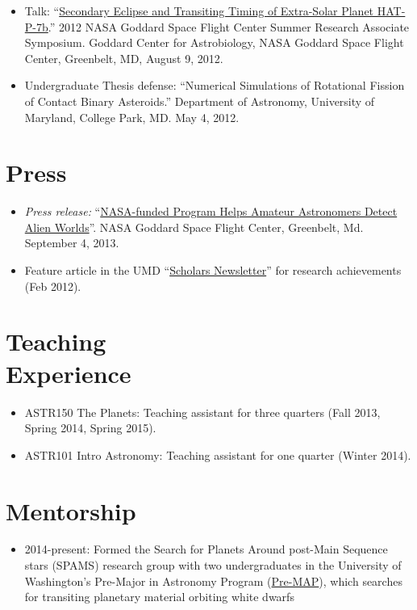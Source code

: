 \documentclass[margin]{res}
\begin{document}
\begin{resume}
\begin{itemize}
\item Talk: ``\href{https://astrobiology.nasa.gov/seminars/featured-seminar-channels/gsfc-summer-internship/2012/08/09/gsfc-summer-research-associate-presentations/}{Secondary Eclipse and Transiting Timing of Extra-Solar Planet HAT-P-7b}.'' 2012 NASA Goddard Space Flight Center Summer Research Associate Symposium. Goddard Center for Astrobiology, NASA Goddard Space Flight Center, Greenbelt, MD, August 9, 2012.

\item Undergraduate Thesis defense:  ``Numerical Simulations of Rotational Fission of Contact Binary Asteroids.'' Department of Astronomy, University of Maryland, College Park, MD. May 4, 2012.\\
\end{itemize}



\section{Press} 
\begin{itemize}
\item {\it Press release:} ``\href{http://www.nasa.gov/content/nasa-funded-program-helps-amateur-astronomers-detect-alien-worlds/}{NASA-funded Program Helps Amateur Astronomers Detect Alien Worlds}''. NASA Goddard Space Flight Center, Greenbelt, Md. September 4, 2013.

\item Feature article in the UMD ``\href{http://www.scholars.umd.edu/news/newsletter/363-february-2012-issue-1}{Scholars Newsletter}'' for research achievements (Feb 2012).\\
\end{itemize}              


\section{Teaching \\Experience}
\begin{itemize}   
\item ASTR150 The Planets: Teaching assistant for three quarters (Fall 2013, Spring 2014, Spring 2015).

\item ASTR101 Intro Astronomy: Teaching assistant for one quarter (Winter 2014). \\
\end{itemize}

\section{Mentorship}
\begin{itemize}
\item 2014-present: Formed the Search for Planets Around post-Main Sequence stars (SPAMS) research group with two undergraduates in the University of Washington's Pre-Major in Astronomy Program (\href{http://www.astro.washington.edu/users/premap/}{Pre-MAP}), which searches for transiting planetary material orbiting white dwarfs\\
\end{itemize}


\end{resume}
\end{document}
